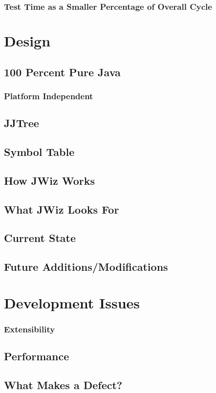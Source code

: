 \subsubsection{Test Time as a Smaller Percentage of Overall Cycle}

\section{Design}
\subsection{100 Percent Pure Java}
\subsubsection{Platform Independent}
\subsection{JJTree}
\subsection{Symbol Table}
\subsection{How JWiz Works} 
\subsection{What JWiz Looks For}
\subsection{Current State}
\subsection{Future Additions/Modifications}

\section{Development Issues}
\subsubsection{Extensibility}
\subsection{Performance}
\subsection{What Makes a Defect?} 
